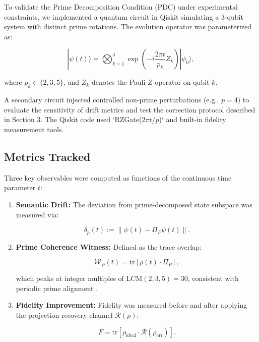 \documentclass[12]{amsart}
\theoremstyle{plain}
\begin{document}
To validate the Prime Decomposition Condition (PDC) under experimental constraints, we implemented a quantum circuit in Qiskit simulating a 3-qubit system with distinct prime rotations. The evolution operator was parameterized as:

\begin{equation}
|\psi(t)\rangle = \bigotimes_{k=1}^3 \exp\left(-i \frac{2\pi t}{p_k} Z_k \right) |\psi_0\rangle,
\end{equation}

where $p_k \in \{2, 3, 5\}$, and $Z_k$ denotes the Pauli-$Z$ operator on qubit $k$.

A secondary circuit injected controlled non-prime perturbations (e.g., $p=4$) to evaluate the sensitivity of drift metrics and test the correction protocol described in Section 3. The Qiskit code used `RZGate($2\pi t/p$)` and built-in fidelity measurement tools.

\subsection{Metrics Tracked}

Three key observables were computed as functions of the continuous time parameter $t$:

\begin{enumerate}
    \item \textbf{Semantic Drift:} The deviation from prime-decomposed state subspace was measured via:

    \begin{equation}
    \delta_p(t) := \left\| \psi(t) - \Pi_P \psi(t) \right\|.
    \end{equation}

    \item \textbf{Prime Coherence Witness:} Defined as the trace overlap:

    \begin{equation}
    \mathcal{W}_P(t) = \text{tr}\left[\rho(t) \cdot \Pi_P\right],
    \end{equation}

    which peaks at integer multiples of $\text{LCM}(2,3,5) = 30$, consistent with periodic prime alignment \cite{multiplicity}.

    \item \textbf{Fidelity Improvement:} Fidelity was measured before and after applying the projection recovery channel $\mathcal{R}(\rho)$:

    \begin{equation}
    F = \text{tr}\left[\rho_{\text{ideal}} \cdot \mathcal{R}(\rho_{\text{err}})\right].
    \end{equation}

\end{enumerate}
\end{document}
